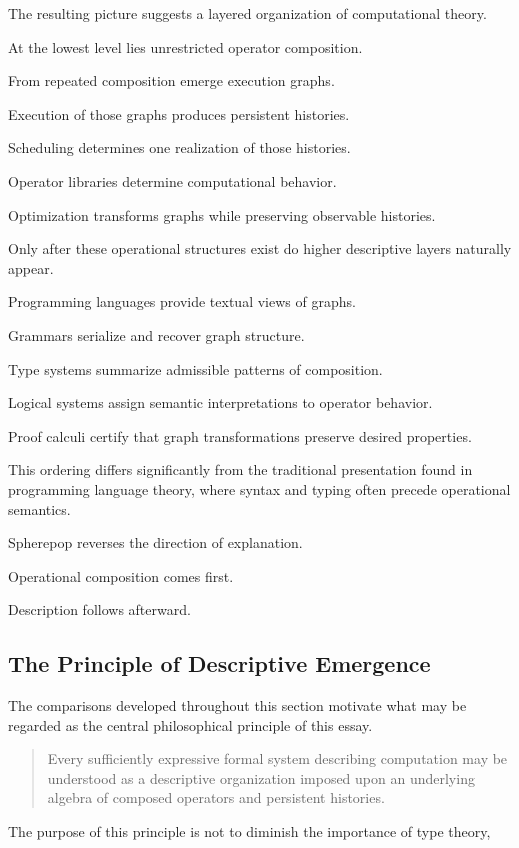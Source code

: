 \documentclass[12pt,oneside]{article}
\begin{document}
The resulting picture suggests a layered organization of computational theory.

At the lowest level lies unrestricted operator composition.

From repeated composition emerge execution graphs.

Execution of those graphs produces persistent histories.

Scheduling determines one realization of those histories.

Operator libraries determine computational behavior.

Optimization transforms graphs while preserving observable histories.

Only after these operational structures exist do higher descriptive layers naturally appear.

Programming languages provide textual views of graphs.

Grammars serialize and recover graph structure.

Type systems summarize admissible patterns of composition.

Logical systems assign semantic interpretations to operator behavior.

Proof calculi certify that graph transformations preserve desired properties.

This ordering differs significantly from the traditional presentation found in programming language theory, where syntax and typing often precede operational semantics.

Spherepop reverses the direction of explanation.

Operational composition comes first.

Description follows afterward.

\subsection{The Principle of Descriptive Emergence}

The comparisons developed throughout this section motivate what may be regarded as the central philosophical principle of this essay.

\begin{quote}
Every sufficiently expressive formal system describing computation may be understood as a descriptive organization imposed upon an underlying algebra of composed operators and persistent histories.
\end{quote}

The purpose of this principle is not to diminish the importance of type theory,
\end{document}
